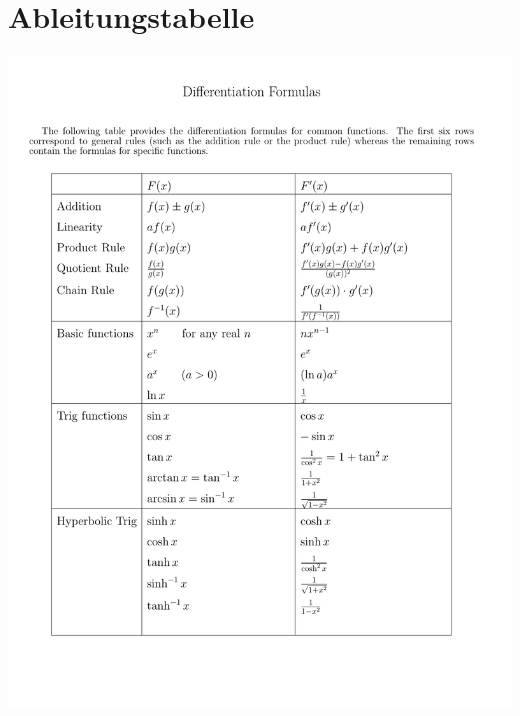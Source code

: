 \clearpage
\section{Ableitungstabelle}

\begin{center}
\includegraphics[page=1,width=14cm,trim=1.75cm 3.0cm 2.5cm 5.0cm,clip]{./files/calcrulz.pdf}
\end{center}
\hfill
